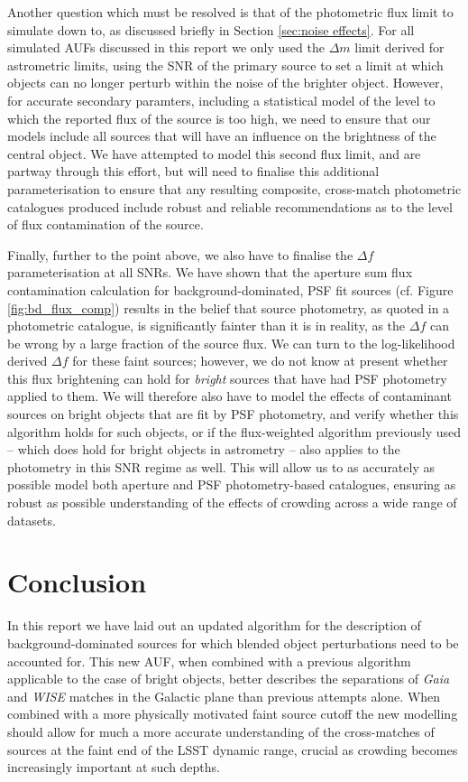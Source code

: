 \documentclass[fleqn,usenatbib]{mnras}
\begin{document}
Another question which must be resolved is that of the photometric flux limit to simulate down to, as discussed briefly in Section \ref{sec:noise effects}. For all simulated AUFs discussed in this report we only used the $\Delta m$ limit derived for astrometric limits, using the SNR of the primary source to set a limit at which objects can no longer perturb within the noise of the brighter object. However, for accurate secondary paramters, including a statistical model of the level to which the reported flux of the source is too high, we need to ensure that our models include all sources that will have an influence on the brightness of the central object. We have attempted to model this second flux limit, and are partway through this effort, but will need to finalise this additional parameterisation to ensure that any resulting composite, cross-match photometric catalogues produced include robust and reliable recommendations as to the level of flux contamination of the source.

Finally, further to the point above, we also have to finalise the $\Delta f$ parameterisation at all SNRs. We have shown that the aperture sum flux contamination calculation for background-dominated, PSF fit sources (cf. Figure \ref{fig:bd_flux_comp}) results in the belief that source photometry, as quoted in a photometric catalogue, is significantly fainter than it is in reality, as the $\Delta f$ can be wrong by a large fraction of the source flux. We can turn to the log-likelihood derived $\Delta f$ for these faint sources; however, we do not know at present whether this flux brightening can hold for \textit{bright} sources that have had PSF photometry applied to them. We will therefore also have to model the effects of contaminant sources on bright objects that are fit by PSF photometry, and verify whether this algorithm holds for such objects, or if the flux-weighted algorithm previously used -- which does hold for bright objects in astrometry -- also applies to the photometry in this SNR regime as well. This will allow us to as accurately as possible model both aperture and PSF photometry-based catalogues, ensuring as robust as possible understanding of the effects of crowding across a wide range of datasets.

\section{Conclusion}
In this report we have laid out an updated algorithm for the description of background-dominated sources for which blended object perturbations need to be accounted for. This new AUF, when combined with a previous algorithm applicable to the case of bright objects, better describes the separations of \textit{Gaia} and \textit{WISE} matches in the Galactic plane than previous attempts alone. When combined with a more physically motivated faint source cutoff the new modelling should allow for much a more accurate understanding of the cross-matches of sources at the faint end of the LSST dynamic range, crucial as crowding becomes increasingly important at such depths.







\bsp	%
\label{lastpage}
\end{document}
